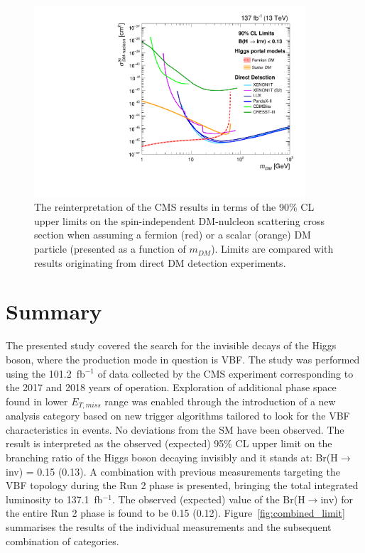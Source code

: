   \begin{figure}[htbp]
    \begin{center}
        \includegraphics[width=0.9\textwidth]{FIt_structure/higgsPortalDM.pdf}
        \caption{The reinterpretation of the CMS results in terms of the 90\% CL upper limits on the spin-independent DM-nulcleon scattering cross section when assuming a fermion (red) or a scalar (orange) DM particle (presented as a function of $m_{DM}$). Limits are compared with results originating from direct DM detection experiments.}
      \label{fig:dm_run2}
    \end{center}
  \end{figure}

\section{Summary}
\hspace{10pt} The presented study covered the search for the invisible decays of the Higgs boson, where the production mode in question is VBF. The study was performed using the 101.2~fb$^{-1}$ of data collected by the CMS experiment corresponding to the 2017 and 2018 years of operation. Exploration of additional phase space found in lower $E_{T,miss}$ range was enabled through the introduction of a new analysis category based on new trigger algorithms tailored to look for the VBF characteristics in events. No deviations from the SM have been observed. The result is interpreted as the observed (expected) 95\% CL upper limit on the branching ratio of the Higgs boson decaying invisibly and it stands at: Br(H$\rightarrow$inv) = 0.15 (0.13). A combination with previous measurements targeting the VBF topology during the Run 2 phase is presented, bringing the total integrated luminosity to 137.1~fb$^{-1}$. The observed (expected) value of the Br(H$\rightarrow$inv) for the entire Run 2 phase is found to be 0.15 (0.12). Figure~\ref{fig:combined_limit} summarises the results of the individual measurements and the subsequent combination of categories.

